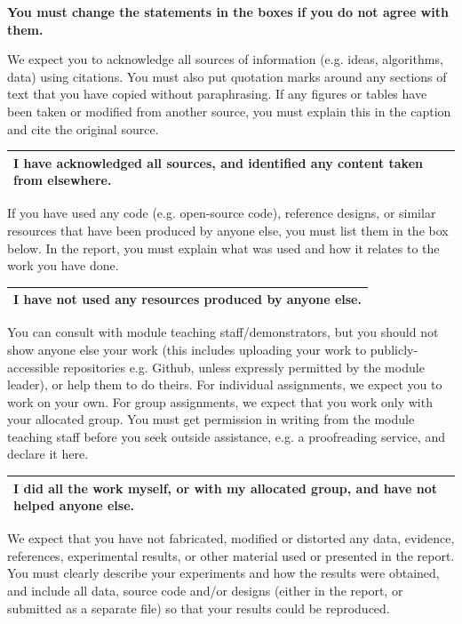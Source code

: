 \documentclass[oneside]{ecsproject}     %
\begin{document}
\textbf{You must change the statements in the boxes if you do not agree with them.}

We expect you to acknowledge all sources of information (e.g. ideas, algorithms, data) using citations. You must also put quotation marks around any sections of text that you have copied without paraphrasing. If any figures or tables have been taken or modified from another source, you must explain this in the caption and cite the original source. 

\footnotesize
\begin{tabular}{|p{\textwidth}|}
\hline
\textbf{I have acknowledged all sources, and identified any content taken from elsewhere.} \\
\hline
\end{tabular}
\small

 If you have used any code (e.g. open-source code), reference designs, or similar resources that have been produced by anyone else, you must list them in the box below. In the report, you must explain what was used and how it relates to the work you have done.

\footnotesize
\begin{tabular}{|p{\textwidth}|}
\hline
\textbf{I have not used any resources produced by anyone else.} \\
\hline
\end{tabular}
\small

 You can consult with module teaching staff/demonstrators, but you should not show anyone else your work (this includes uploading your work to publicly-accessible repositories e.g. Github, unless expressly permitted by the module leader), or help them to do theirs. For individual assignments, we expect you to work on your own. For group assignments, we expect that you work only with your allocated group. You must get permission in writing from the module teaching staff before you seek outside assistance, e.g. a proofreading service, and declare it here.

\footnotesize
\begin{tabular}{|p{\textwidth}|}
\hline
\textbf{I did all the work myself, or with my allocated group, and have not helped anyone else.} \\
\hline
\end{tabular}
\small

 We expect that you have not fabricated, modified or distorted any data, evidence, references, experimental results, or other material used or presented in the report. You must clearly describe your experiments and how the results were obtained, and include all data, source code and/or designs (either in the report, or submitted as a separate file) so that your results could be reproduced. 
\end{document}
